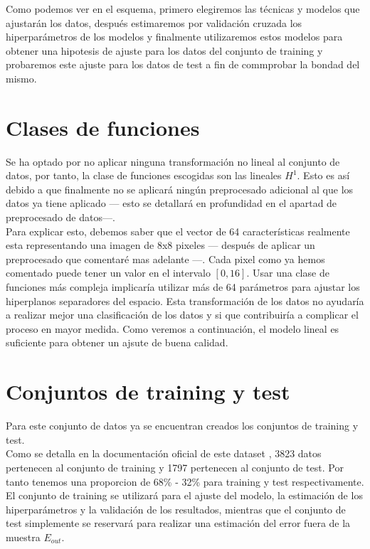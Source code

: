 Como podemos ver en el esquema, primero elegiremos las técnicas y modelos que ajustarán los datos, después estimaremos por validación cruzada los hiperparámetros de los modelos y finalmente utilizaremos estos modelos para obtener una hipotesis de ajuste para los datos del conjunto de training y probaremos este ajuste para los datos de test a fin de commprobar la bondad del mismo.
\newpage
\section{Clases de funciones}
Se ha optado por no aplicar ninguna transformación no lineal al conjunto de datos, por tanto, la clase de funciones escogidas son las lineales $H^{1}$. Esto es así debido a que finalmente no se aplicará ningún preprocesado adicional al que los datos ya tiene aplicado --- esto se detallará en profundidad en el apartad de preprocesado de datos---.\\
Para explicar esto, debemos saber que el vector de 64 características realmente esta representando una imagen de 8x8 pixeles --- después de aplicar un preprocesado que comentaré mas adelante ---. Cada pixel como ya hemos comentado puede tener un valor en el intervalo $[0,16]$.
Usar una clase de funciones más compleja implicaría utilizar más de 64 parámetros para ajustar los hiperplanos separadores del espacio. Esta transformación de los datos no ayudaría a realizar mejor una clasificación de los datos y si que contribuiría a complicar el proceso en mayor medida. Como veremos a continuación, el modelo lineal es suficiente para obtener un ajsute de buena calidad.

\section{Conjuntos de training y test}
Para este conjunto de datos ya se encuentran creados los conjuntos de training y test.\\
Como se detalla en la documentación oficial de este dataset \cite{Optical}, 3823 datos pertenecen al conjunto de training y 1797 pertenecen al conjunto de test. Por tanto tenemos una proporcion de 68\% - 32\% para training y test respectivamente.\\
El conjunto de training se utilizará para el ajuste del modelo, la estimación de los hiperparámetros y la validación de los resultados, mientras que el conjunto de test simplemente se reservará para realizar una estimación del error fuera de la muestra $E_{out}$.

